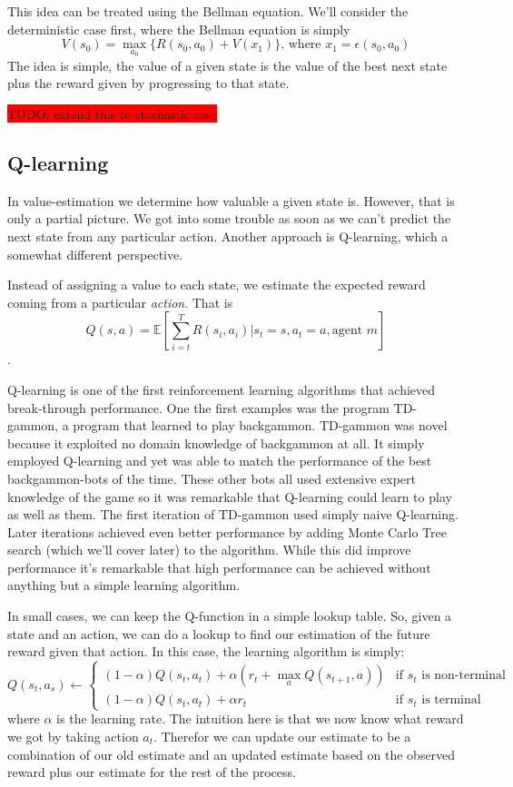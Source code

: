 \documentclass{article}
\theoremstyle{changedot}
\theoremstyle{changedotbreak}
\theoremstyle{nonumberplain}
\begin{document}
This idea can be treated using the Bellman equation. We'll consider the deterministic case first, where the Bellman equation is simply
\[V(s_{0}) = \max_{a_{0}} \{R(s_{0}, a_{0}) + V(x_{1}) \} \text{, where } x_{1} = \epsilon(s_{0}, a_{0})\]
The idea is simple, the value of a given state is the value of the best next state plus the reward given by progressing to that state. 

\colorbox{red}{TODO: extend this to stochastic case}

\subsection{Q-learning}
In value-estimation we determine how valuable a given state is. However, that is only a partial picture. We got into some trouble as soon as we can't predict the next state from any particular action. Another approach is Q-learning, which a somewhat different perspective.

Instead of assigning a value to each state, we estimate the expected reward coming from a particular \emph{action}. That is
\[Q(s, a) = \mathbb{E}[\sum_{i=t}^{T} R(s_{i}, a_{i}) | s_{t}=s, a_{t}=a, \text{agent } m]\].

Q-learning is one of the first reinforcement learning algorithms that achieved break-through performance. One the first examples was the program TD-gammon, a program that learned to play backgammon. TD-gammon was novel because it exploited no domain knowledge of backgammon at all. It simply employed Q-learning and yet was able to match the performance of the best backgammon-bots of the time. These other bots all used extensive expert knowledge of the game so it was remarkable that Q-learning could learn to play as well as them. The first iteration of TD-gammon used simply naive Q-learning. Later iterations achieved even better performance by adding Monte Carlo Tree search (which we'll cover later) to the algorithm. While this did improve performance it's remarkable that high performance can be achieved without anything but a simple learning algorithm.

In small cases, we can keep the Q-function in a simple lookup table. So, given a state and an action, we can do a lookup to find our estimation of the future reward given that action. In this case, the learning algorithm is simply:
\[Q(s_{t}, a_{s}) \leftarrow \begin{cases} (1 - \alpha)Q(s_{t}, a_{t}) + \alpha (r_{t} + \max_{a} Q(s_{t+1}, a)) & \text{if  $s_{t}$ is non-terminal} \\ (1 - \alpha) Q(s_{t}, a_{t}) + \alpha r_{t} & \text{if $s_{t}$ is terminal} \end{cases}\]
where $\alpha$ is the learning rate. The intuition here is that we now know what reward we got by taking action $a_{t}$. Therefor we can update our estimate to be a combination of our old estimate and an updated estimate based on the observed reward plus our estimate for the rest of the process.
\end{document}
